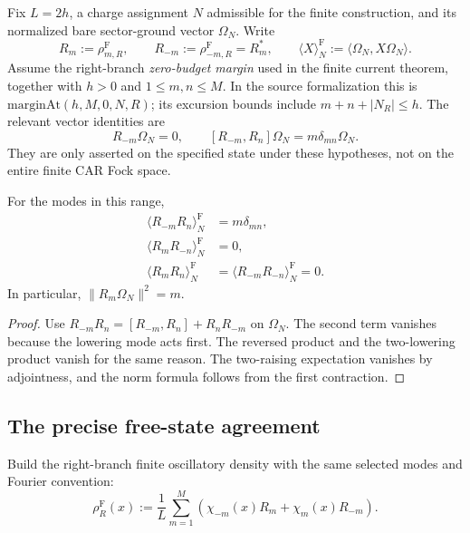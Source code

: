 Fix $L=2h$, a charge assignment $N$ admissible for the finite
construction, and its normalized bare sector-ground vector $\Omega_N$.
Write
\begin{equation}
 R_m:=\rho^{\mathrm F}_{m,R},\qquad
 R_{-m}:=\rho^{\mathrm F}_{-m,R}=R_m^*,
 \qquad \langle X\rangle^{\mathrm F}_N
 :=\langle\Omega_N,X\Omega_N\rangle.
 \label{eq:ch19-comp-two-evaluators}
\end{equation}
Assume the right-branch \emph{zero-budget margin} used in the finite
current theorem, together with $h>0$ and $1\leq m,n\leq M$.
In the source formalization this is
$\mathrm{marginAt}(h,M,0,N,R)$; its excursion bounds include
$m+n+|N_R|\leq h$.  The relevant vector identities are
\begin{equation}
 R_{-m}\Omega_N=0,
 \qquad [R_{-m},R_n]\Omega_N=m\delta_{mn}\Omega_N.
 \label{eq:ch19-comp-ground-commutator}
\end{equation}
They are only asserted on the specified state under these
hypotheses, not on the entire finite CAR Fock space.

\begin{proposition}
\label{prop:ch19-comp-ground-contractions}
For the modes in this range,
\begin{align}
 \langle R_{-m}R_n\rangle^{\mathrm F}_N&=m\delta_{mn},
   \label{eq:ch19-comp-lr}\\
 \langle R_mR_{-n}\rangle^{\mathrm F}_N&=0,
   \label{eq:ch19-comp-rl}\\
 \langle R_mR_n\rangle^{\mathrm F}_N
  &=\langle R_{-m}R_{-n}\rangle^{\mathrm F}_N=0.
   \label{eq:ch19-comp-same-sign}
\end{align}
In particular, $\|R_m\Omega_N\|^2=m$.
\end{proposition}
\begin{proof}
Use
$R_{-m}R_n=[R_{-m},R_n]+R_nR_{-m}$ on $\Omega_N$.
The second term vanishes because the lowering mode acts first.
The reversed product and the two-lowering product vanish for the
same reason.  The two-raising expectation vanishes by adjointness,
and the norm formula follows from the first contraction.
\end{proof}

\subsection*{The precise free-state agreement}

Build the right-branch finite oscillatory density with the same
selected modes and Fourier convention:
\begin{equation}
 \rho_R^{\mathrm F}(x)
 :=\frac1L\sum_{m=1}^{M}
 \left(\chi_{-m}(x)R_m+\chi_m(x)R_{-m}\right).
 \label{eq:ch19-comp-fock-density}
\end{equation}

